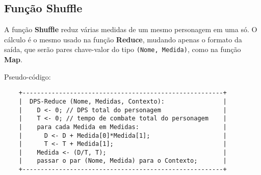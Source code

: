 \documentclass[a4paper,11pt]{article}
\begin{document}
  
  \subsection{Função \textbf{Shuffle}}
  
    A função \textbf{Shuffle} reduz várias medidas de um mesmo personagem em uma
    só. O cálculo é o mesmo usado na função \textbf{Reduce}, mudando apenas o
    formato da saída, que serão pares chave-valor do tipo \verb$(Nome, Medida)$,
    como na função \textbf{Map}.
    
    Pseudo-código:
    
    \begin{verbatim}
    +-------------------------------------------------------+
    |  DPS-Reduce (Nome, Medidas, Contexto):                |
    |    D <- 0; // DPS total do personagem                 |
    |    T <- 0; // tempo de combate total do personagem    |
    |    para cada Medida em Medidas:                       |
    |      D <- D + Medida[0]*Medida[1];                    |
    |      T <- T + Medida[1];                              |
    |    Medida <- (D/T, T);                                |
    |    passar o par (Nome, Medida) para o Contexto;       |
    +-------------------------------------------------------+
    \end{verbatim}
\end{document}
